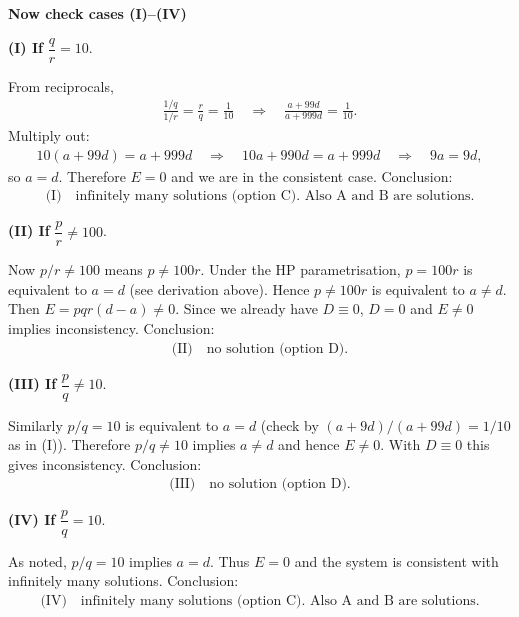\documentclass{beamer}
\theoremstyle{remark}
\numberwithin{equation}{section}
\begin{document}
\begin{frame}
\noindent\textbf{Now check cases (I)--(IV) }


\noindent\textbf{(I) If } $\dfrac{q}{r}=10$.

From reciprocals,
\begin{align}
\frac{1/q}{1/r} = \frac{r}{q} = \frac{1}{10} \quad\Longrightarrow\quad
\frac{a+99d}{a+999d} = \frac{1}{10}.
\end{align}
Multiply out:
\begin{align}
10(a+99d) = a+999d \quad\Longrightarrow\quad 10a+990d = a+999d \quad\Longrightarrow\quad 9a = 9d,
\end{align}
so \(a=d\). Therefore \(E=0\) and we are in the consistent case. Conclusion:
\begin{align}
\text{(I)}\quad\boxed{\text{infinitely many solutions (option C). \ Also A and B are solutions.}}
\end{align}

\end{frame}

\begin{frame}
\noindent\textbf{(II) If } $\dfrac{p}{r}\neq 100$.

Now \(p/r\neq100\) means \(p\neq100r\). Under the HP parametrisation, \(p=100r\) is equivalent to \(a=d\) (see derivation above). Hence \(p\neq100r\) is equivalent to \(a\neq d\). Then \(E = pqr(d-a)\neq0\). Since we already have \(D\equiv0\), \(D=0\) and \(E\neq0\) implies inconsistency. Conclusion:
\begin{align}
\text{(II)}\quad\boxed{\text{no solution (option D).}}
\end{align}



\noindent\textbf{(III) If } $\dfrac{p}{q}\neq 10$.

Similarly \(p/q = 10\) is equivalent to \(a=d\) (check by \((a+9d)/(a+99d)=1/10\) as in (I)). Therefore \(p/q\neq10\) implies \(a\neq d\) and hence \(E\neq0\). With \(D\equiv0\) this gives inconsistency. Conclusion:
\begin{align}
\text{(III)}\quad\boxed{\text{no solution (option D).}}
\end{align}

\end{frame}

\begin{frame}
\noindent\textbf{(IV) If } $\dfrac{p}{q}=10$.

As noted, \(p/q=10\) implies \(a=d\). Thus \(E=0\) and the system is consistent with infinitely many solutions. Conclusion:
\begin{align}
\text{(IV)}\quad\boxed{\text{infinitely many solutions (option C). \ Also A and B are solutions.}}
\end{align}

\end{frame}
\end{document}
